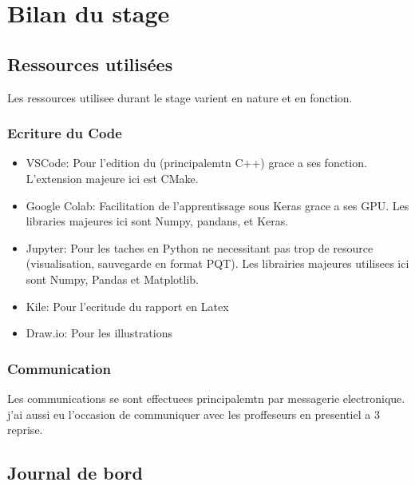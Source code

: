 
\chapter{Bilan du stage} %

\label{Chapter5} %


\section{Ressources utilisées}

Les ressources utilisee durant le stage varient en nature et en fonction.

\subsection{Ecriture du Code}
\begin{itemize}
 \item VSCode: Pour l'edition du (principalemtn C++) grace a ses fonction. L'extension majeure ici est CMake.
 \item Google Colab: Facilitation de l'apprentissage sous Keras grace a ses GPU. Les libraries majeures ici sont Numpy, pandans, et Keras.
 \item Jupyter: Pour les taches en Python ne necessitant pas trop de resource (visualisation, sauvegarde en format PQT). Les librairies majeures utilisees ici sont Numpy, Pandas et Matplotlib.
 \item Kile: Pour l'ecritude du rapport en Latex
 \item Draw.io: Pour les illustrations 
\end{itemize}


\subsection{Communication}
Les communications se sont effectuees principalemtn par messagerie electronique. j'ai aussi eu l'occasion de communiquer avec les proffeseurs en presentiel a 3 reprise.


\section{Journal de bord}

